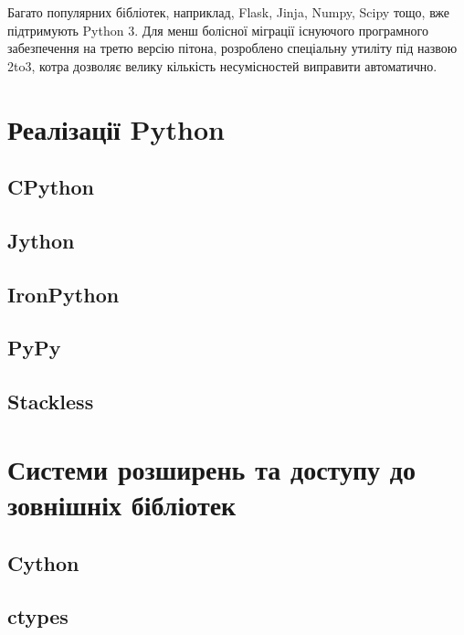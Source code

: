 \documentclass[a4paper, 12pt]{article}
\begin{document}
Багато популярних бібліотек, наприклад, Flask, Jinja, Numpy, Scipy тощо, вже підтримують Python 3. Для менш болісної міграції існуючого програмного забезпечення на третю версію пітона, розроблено спеціальну утиліту під назвою 2to3, котра дозволяє велику кількість несумісностей виправити автоматично.

\section{Реалізації Python}

\subsection{CPython}

\subsection{Jython}

\subsection{IronPython}

\subsection{PyPy}

\subsection{Stackless}

\section{Системи розширень та доступу до зовнішніх бібліотек}

\subsection{Cython}

\subsection{ctypes}
\end{document}
